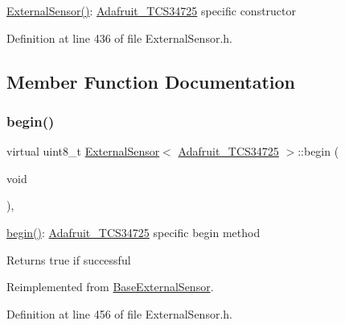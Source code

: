 \hyperlink{class_external_sensor_3_01_adafruit___t_c_s34725_01_4_a3b1855d165d295332b53e074344e3281}{External\+Sensor()}\+: \hyperlink{class_adafruit___t_c_s34725}{Adafruit\+\_\+\+T\+C\+S34725} specific constructor 

Definition at line 436 of file External\+Sensor.\+h.



\subsection{Member Function Documentation}
\mbox{\label{class_external_sensor_3_01_adafruit___t_c_s34725_01_4_ad9c1d1ac1f34ce1c153a0563d9cc55df}} 
\subsubsection{\texorpdfstring{begin()}{begin()}}
{\footnotesize\ttfamily virtual uint8\+\_\+t \hyperlink{class_external_sensor}{External\+Sensor}$<$ \hyperlink{class_adafruit___t_c_s34725}{Adafruit\+\_\+\+T\+C\+S34725} $>$\+::begin (\begin{DoxyParamCaption}\item[{void}]{ }\end{DoxyParamCaption})\hspace{0.3cm}{\ttfamily [inline]}, {\ttfamily [virtual]}}

\hyperlink{class_external_sensor_3_01_adafruit___t_c_s34725_01_4_ad9c1d1ac1f34ce1c153a0563d9cc55df}{begin()}\+: \hyperlink{class_adafruit___t_c_s34725}{Adafruit\+\_\+\+T\+C\+S34725} specific begin method

\begin{DoxyReturn}{Returns}
true if successful 
\end{DoxyReturn}


Reimplemented from \hyperlink{class_base_external_sensor_a87d132803d4f4fdd4e66332809f0c9a0}{Base\+External\+Sensor}.



Definition at line 456 of file External\+Sensor.\+h.

\mbox{\label{class_external_sensor_3_01_adafruit___t_c_s34725_01_4_a129ee155fe53aa069cb972bcf52e25f7}} 
